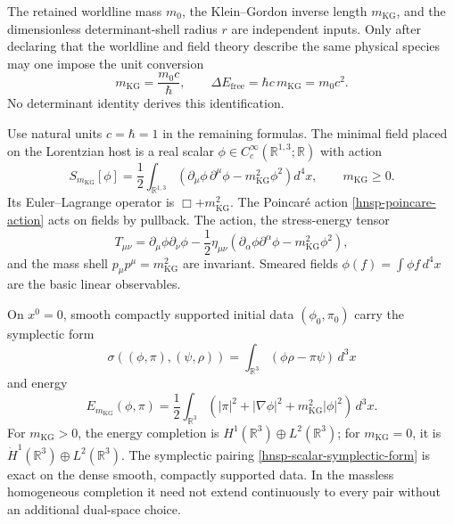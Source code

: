 The retained worldline mass \(m_0\), the Klein--Gordon inverse length
\(m_{\mathrm{KG}}\), and the dimensionless determinant-shell radius \(r\) are
independent inputs.  Only after declaring that the worldline and field theory
describe the same physical species may one impose the unit conversion
\[
 m_{\mathrm{KG}}=\frac{m_0c}{\hbar},
 \qquad
 \Delta E_{\mathrm{free}}=\hbar c\,m_{\mathrm{KG}}=m_0c^2.
\]
No determinant identity derives this identification.

Use natural units \(c=\hbar=1\) in the remaining formulas.  The minimal
field placed on the Lorentzian host is a real scalar
\(\phi\in C_c^\infty(\mathbb R^{1,3};\mathbb R)\) with action
\begin{equation}
 S_{m_{\mathrm{KG}}}[\phi]=\frac12\int_{\mathbb R^{1,3}}
 \left(\partial_\mu\phi\,\partial^\mu\phi-m_{\mathrm{KG}}^2\phi^2\right)d^4x,
 \qquad m_{\mathrm{KG}}\geq0.
 \label{hnsp-klein-gordon-action}
\end{equation}
Its Euler--Lagrange operator is \(\Box+m_{\mathrm{KG}}^2\).  The Poincar\'e action
\eqref{hnsp-poincare-action} acts on fields by pullback.  The action, the
stress-energy tensor
\begin{equation}
 T_{\mu\nu}=\partial_\mu\phi\partial_\nu\phi
 -\frac12\eta_{\mu\nu}
  (\partial_\alpha\phi\partial^\alpha\phi-m_{\mathrm{KG}}^2\phi^2),
 \label{hnsp-stress-energy}
\end{equation}
and the mass shell \(p_\mu p^\mu=m_{\mathrm{KG}}^2\) are invariant.  Smeared fields
\(\phi(f)=\int\phi f\,d^4x\) are the basic linear observables.

On \(x^0=0\), smooth compactly supported initial data
\((\phi_0,\pi_0)\) carry the symplectic form
\begin{equation}
 \sigma((\phi,\pi),(\psi,\rho))
 =\int_{\mathbb R^3}(\phi\rho-\pi\psi)\,d^3x
 \label{hnsp-scalar-symplectic-form}
\end{equation}
and energy
\begin{equation}
 E_{m_{\mathrm{KG}}}(\phi,\pi)=\frac12\int_{\mathbb R^3}
 (|\pi|^2+|\nabla\phi|^2+m_{\mathrm{KG}}^2|\phi|^2)\,d^3x.
 \label{hnsp-scalar-energy}
\end{equation}
For \(m_{\mathrm{KG}}>0\), the energy completion is
\(H^1(\mathbb R^3)\oplus L^2(\mathbb R^3)\); for \(m_{\mathrm{KG}}=0\), it is
\(\dot H^1(\mathbb R^3)\oplus L^2(\mathbb R^3)\).  The symplectic pairing
\eqref{hnsp-scalar-symplectic-form} is exact on the dense smooth,
compactly supported data.  In the massless homogeneous completion it need not
extend continuously to every pair without an additional dual-space choice.

